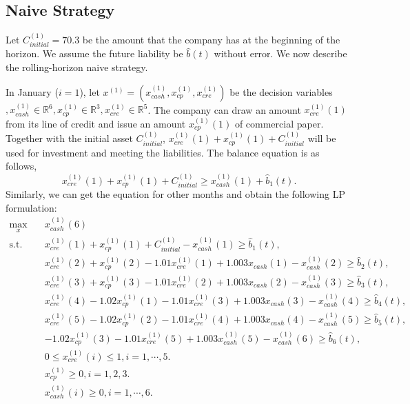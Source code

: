 \documentclass[14pt]{article}
\begin{document}
\subsection{Naive Strategy}

    Let $C^{(1)}_{initial} = 70.3$ be the amount that the company has at the beginning of the horizon. We assume the future liability be $\hat{b}(t)$ without error. We now describe the rolling-horizon naive strategy.
    
    In January ($i = 1$), let $x^{(1)}=(x^{(1)}_{cash}, x^{(1)}_{cp}, x^{(1)}_{cre})$ be the decision variables $, x^{(1)}_{cash}\in\mathbb{R}^6, x^{(1)}_{cp}\in\mathbb{R}^3, x^{(1)}_{cre}\in\mathbb{R}^5$. The company can draw an amount $x^{(1)}_{cre}(1)$ from its line of credit and issue an amount $x^{(1)}_{cp}(1)$ of commercial paper. Together with the initial asset $C^{(1)}_{initial}$, $x^{(1)}_{cre}(1)+x^{(1)}_{cp}(1)+C^{(1)}_{initial}$ will be used for investment and meeting the liabilities. The balance equation is as follows, 
    \[
        x^{(1)}_{cre}(1)+x^{(1)}_{cp}(1)+C^{(1)}_{initial}\geq x^{(1)}_{cash}(1) + \hat{b}_1(t).
    \]
    Similarly, we can get the equation for other months and obtain the following LP formulation:
    \[
        \begin{split}
            \max_{x} \quad & x^{(1)}_{cash}(6) \\
            \text{s.t.} \quad 
            & x^{(1)}_{cre}(1) + x^{(1)}_{cp}(1)+C^{(1)}_{initial}-x^{(1)}_{cash}(1) \geq \hat{b}_1(t), \\
            & x^{(1)}_{cre}(2) + x^{(1)}_{cp}(2) -1.01x^{(1)}_{cre}(1) + 1.003x_{cash}(1) -x^{(1)}_{cash}(2) \geq \hat{b}_2(t),  \\
            & x^{(1)}_{cre}(3) + x^{(1)}_{cp}(3) -1.01x^{(1)}_{cre}(2) + 1.003x_{cash}(2) -x^{(1)}_{cash}(3) \geq \hat{b}_3(t),  \\
            & x^{(1)}_{cre}(4) - 1.02x^{(1)}_{cp}(1) - 1.01x^{(1)}_{cre}(3) + 1.003x_{cash}(3) - x^{(1)}_{cash}(4) \geq \hat{b}_4(t),  \\
            & x^{(1)}_{cre}(5) - 1.02x^{(1)}_{cp}(2) - 1.01x^{(1)}_{cre}(4) + 1.003x_{cash}(4) - x^{(1)}_{cash}(5) \geq \hat{b}_5(t),  \\
            & - 1.02x^{(1)}_{cp}(3) - 1.01x^{(1)}_{cre}(5) + 1.003x^{(1)}_{cash}(5) - x^{(1)}_{cash}(6) \geq \hat{b}_6(t),  \\
            & 0 \leq x^{(1)}_{cre}(i) \leq 1, i = 1, \cdots, 5.\\
            & x^{(1)}_{cp} \geq 0, i = 1, 2, 3.\\
            & x^{(1)}_{cash}(i)\geq 0, i = 1, \cdots, 6.
        \end{split}
    \]
\end{document}
